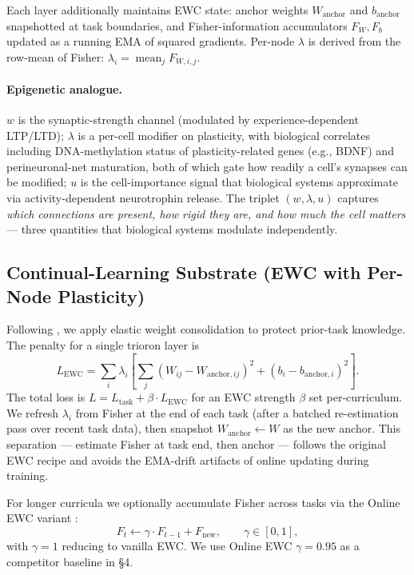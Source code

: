 \documentclass[11pt]{article}
\newcommand{\anchorW}{W_{\text{anchor}}}
\newcommand{\anchorB}{b_{\text{anchor}}}
\newcommand{\Lewc}{L_{\text{EWC}}}
\newcommand{\Ltask}{L_{\text{task}}}
\begin{document}
Each layer additionally maintains EWC state: anchor weights $\anchorW$ and
$\anchorB$ snapshotted at task boundaries, and Fisher-information
accumulators $F_W, F_b$ updated as a running EMA of squared gradients.
Per-node $\lambda$ is derived from the row-mean of Fisher:
$\lambda_i = \operatorname{mean}_j F_{W,i,j}$.

\paragraph{Epigenetic analogue.}
$w$ is the synaptic-strength channel (modulated by experience-dependent
LTP/LTD); $\lambda$ is a per-cell modifier on plasticity, with biological
correlates including DNA-methylation status of plasticity-related genes
(e.g., BDNF) and perineuronal-net maturation, both of which gate how
readily a cell's synapses can be modified; $u$ is the cell-importance
signal that biological systems approximate via activity-dependent
neurotrophin release. The triplet $(w, \lambda, u)$ captures \emph{which
connections are present, how rigid they are, and how much the cell
matters} --- three quantities that biological systems modulate
independently.

\subsection{Continual-Learning Substrate (EWC with Per-Node Plasticity)}
\label{sec:ewc-substrate}

Following \citet{kirkpatrick2017overcoming}, we apply elastic weight consolidation
to protect prior-task knowledge. The penalty for a single trioron layer is
\begin{equation}
  \Lewc = \sum_i \lambda_i \left[
    \sum_j (W_{ij} - W_{\text{anchor},ij})^{2}
         + (b_i - b_{\text{anchor},i})^{2}
  \right].
\end{equation}
The total loss is $L = \Ltask + \beta \cdot \Lewc$ for an EWC strength
$\beta$ set per-curriculum. We refresh $\lambda_i$ from Fisher at the end
of each task (after a batched re-estimation pass over recent task data),
then snapshot $\anchorW \leftarrow W$ as the new anchor. This separation
--- estimate Fisher at task end, then anchor --- follows the original EWC
recipe and avoids the EMA-drift artifacts of online updating during
training.

For longer curricula we optionally accumulate Fisher across tasks via the
Online EWC variant \citep{schwarz2018progress}:
\begin{equation}
  F_t \leftarrow \gamma \cdot F_{t-1} + F_{\text{new}},
  \qquad \gamma \in [0, 1],
\end{equation}
with $\gamma = 1$ reducing to vanilla EWC. We use Online EWC
$\gamma = 0.95$ as a competitor baseline in \S4.
\end{document}
